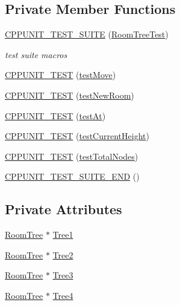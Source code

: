\subsection*{Private Member Functions}
\begin{DoxyCompactItemize}
\item 
\hyperlink{classRoomTreeTest_a38df4c66be0d341a6d12fda7fdd1d6a4}{C\-P\-P\-U\-N\-I\-T\-\_\-\-T\-E\-S\-T\-\_\-\-S\-U\-I\-T\-E} (\hyperlink{classRoomTreeTest}{Room\-Tree\-Test})
\begin{DoxyCompactList}\small\item\em test suite macros \end{DoxyCompactList}\item 
\hyperlink{classRoomTreeTest_a0036ded2c0eebf44f7efe33a6599191e}{C\-P\-P\-U\-N\-I\-T\-\_\-\-T\-E\-S\-T} (\hyperlink{classRoomTreeTest_aab3dedfa3aaa0bfab811a8d0d8c8b7e0}{test\-Move})
\item 
\hyperlink{classRoomTreeTest_a3e253c371a946e2bc196ac4c83023c21}{C\-P\-P\-U\-N\-I\-T\-\_\-\-T\-E\-S\-T} (\hyperlink{classRoomTreeTest_a1f342a990eb4b60cfae96dac1dbbedee}{test\-New\-Room})
\item 
\hyperlink{classRoomTreeTest_a0eac4e16bb37465e894eb1a6ad74900e}{C\-P\-P\-U\-N\-I\-T\-\_\-\-T\-E\-S\-T} (\hyperlink{classRoomTreeTest_a7999cf9d9149ade6f39fbb7be601805e}{test\-At})
\item 
\hyperlink{classRoomTreeTest_a15f3666905d1c207aa1f90b445cb6f7f}{C\-P\-P\-U\-N\-I\-T\-\_\-\-T\-E\-S\-T} (\hyperlink{classRoomTreeTest_a67dd37f922aabba4fefe925cfbd8483a}{test\-Current\-Height})
\item 
\hyperlink{classRoomTreeTest_aa665ae61a669fecbdc3db4cb06c47767}{C\-P\-P\-U\-N\-I\-T\-\_\-\-T\-E\-S\-T} (\hyperlink{classRoomTreeTest_a59d8363440d55c68ef79109efe88a5f5}{test\-Total\-Nodes})
\item 
\hyperlink{classRoomTreeTest_a22c287ede74b7fc2591ceee86d10d85a}{C\-P\-P\-U\-N\-I\-T\-\_\-\-T\-E\-S\-T\-\_\-\-S\-U\-I\-T\-E\-\_\-\-E\-N\-D} ()
\end{DoxyCompactItemize}
\subsection*{Private Attributes}
\begin{DoxyCompactItemize}
\item 
\hyperlink{classRoomTree}{Room\-Tree} $\ast$ \hyperlink{classRoomTreeTest_aba5c37d20a82bff695de4c78a547f23f}{Tree1}
\item 
\hyperlink{classRoomTree}{Room\-Tree} $\ast$ \hyperlink{classRoomTreeTest_aada805154b8f5306805936f0ba43834c}{Tree2}
\item 
\hyperlink{classRoomTree}{Room\-Tree} $\ast$ \hyperlink{classRoomTreeTest_aa70878ec1fa44e95f78e59a236572b27}{Tree3}
\item 
\hyperlink{classRoomTree}{Room\-Tree} $\ast$ \hyperlink{classRoomTreeTest_afaaf16b5f57fc43c3e265dca242af31e}{Tree4}
\end{DoxyCompactItemize}



